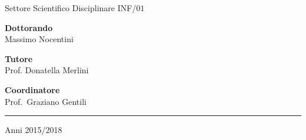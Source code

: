 \begin{titlingpage}
\begin{center}
\large
Settore Scientifico Disciplinare INF/$01$
\end{center}
\par \vspace{10mm}

\normalsize
\hspace{1cm}\begin{minipage}{0.42\linewidth}
\textbf{Dottorando}
\\
{Massimo Nocentini}
\end{minipage}
\hspace{2cm}
\begin{minipage}{0.42\linewidth}
\textbf{Tutore}
\\
{Prof. Donatella Merlini}

\end{minipage}
\par \vspace{10mm}

\begin{center}
\begin{minipage}{0.30\linewidth}
\textbf{Coordinatore}
\\
{Prof.~Graziano Gentili}
\end{minipage}
\end{center}
\par \vspace{9mm}
\begin{center}
\hrule
\par \vspace{5mm}
Anni 2015/2018

\end{center}
\end{titlingpage}
\restoregeometry
